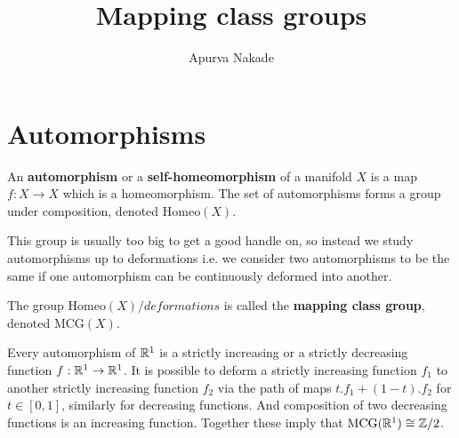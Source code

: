 \iffalse
It's unfair to say that mathematicians aren't real doctors, we perform surgeries all the time. In this class we'll introduce the notion of a topological manifold via simplicial (delta) complexes. Spend a day or two doing examples and go over several notions like orientation, cobordism and of course surgery.

Keywords: simplicial complex, manifold, orientation, cobordism, surgery

Type: Lecture
Homework: Recommended
Prereqs: None
\fi





\title{Mapping class groups}
\author{Apurva Nakade}
\thispagestyle{fancy}
\maketitle



\section{Automorphisms}

\begin{definition}
	An \textbf{automorphism} or a \textbf{self-homeomorphism} of a manifold $X$ is a map $f:X \rightarrow X$ which is a homeomorphism. The set of automorphisms forms a group under composition, denoted ${\mathrm{Homeo}(X)}$.
\end{definition}

This group is usually too big to get a good handle on, so instead we study automorphisms up to deformations i.e. we consider two automorphisms to be the same if one automorphism can be continuously deformed into another.

\begin{definition}
	The group $\mathrm{Homeo}(X)/{deformations}$ is called the \textbf{mapping class group}, denoted $\mathrm{MCG}(X)$.
\end{definition}

\begin{example}\label{thm:MCG}
	Every automorphism of $\mathbb{R}^1$ is a strictly increasing or a strictly decreasing function $f:\mathbb{R}^1 \rightarrow \mathbb{R}^1$. It is possible to deform a strictly increasing function $f_1$ to another strictly increasing function $f_2$ via the path of maps $t.f_1 + (1-t).f_2$ for $t\in[0,1]$, similarly for decreasing functions. And composition of two decreasing functions is an increasing function. Together these imply that $\mathrm{MCG}(\mathbb{R}^1) \cong \mathbb{Z}/2$.
\end{example}

